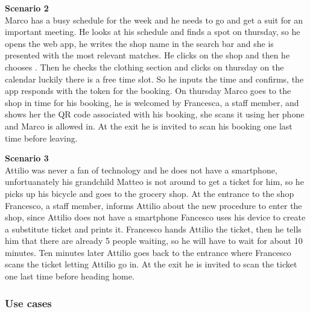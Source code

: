 \textbf{Scenario 2}\\
Marco has a busy schedule for the week and he needs to go and get a suit for an important meeting. He looks at his schedule and finds a spot on thursday, so he opens the web app, he writes the shop name in the search bar and she is presented with the most relevant matches. He clicks on the shop and then he chooses . Then he checks the clothing section and clicks on thursday on the calendar luckily there is a free time slot. So he inputs the time and confirms, the app responds with the token for the booking. On thursday Marco goes to the shop in time for his booking, he is welcomed by Francesca, a staff member, and shows her the QR code associated with his booking, she scans it using her phone and Marco is allowed in. At the exit he is invited to scan his booking one last time before leaving.

\textbf{Scenario 3}\\
Attilio was never a fan of technology and he does not have a smartphone, unfortuanately his grandchild Matteo is not around to get a ticket for him, so he picks up his bicycle and goes to the grocery shop. At the entrance to the shop Francesco, a staff member, informs Attilio about the new procedure to enter the shop, since Attilio does not have a smartphone Fancesco uses his device to create a substitute ticket and prints it. Francesco hands Attilio the ticket, then he tells him that there are already 5 people waiting, so he will have to wait for about 10 minutes. Ten minutes later Attilio goes back to the entrance where Francesco scans the ticket letting Attilio go in. At the exit he is invited to scan the ticket one last time before heading home.

\subsubsection{Use cases}


